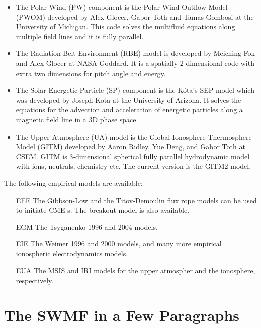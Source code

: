 \begin{itemize}
\item
The Polar Wind (PW) component is the Polar Wind Outflow Model (PWOM)
developed by Alex Glocer, Gabor Toth and Tamas Gombosi
at the University of Michigan.  This code solves the
multifluid equations along multiple field lines and it is fully parallel.

\item
The Radiation Belt Environment (RBE) model is developed by Meiching Fok
and Alex Glocer at NASA Goddard. It is a spatially 2-dimensional code with 
extra two dimensions for pitch angle and energy. 

\item
The Solar Energetic Particle (SP) component is the
K\'ota's SEP model which was developed by Joseph Kota 
at the University of Arizona.
It solves the equations for the advection and acceleration of
energetic particles along a magnetic field line in a 3D phase space.

\item
The Upper Atmosphere (UA) model is the 
Global Ionosphere-Thermosphere Model (GITM) 
developed by Aaron Ridley, Yue Deng, and Gabor Toth at CSEM.
GITM is 3-dimensional spherical
fully parallel hydrodynamic model with ions, neutrals, chemistry etc.
The current version is the GITM2 model.

\end{itemize}
The following empirical models are available:
\begin{itemize}
\item[EEE] The Gibbson-Low and the Titov-Demoulin flux rope models
          can be used to initiate CME-s. The breakout model is
          also available.
\item[EGM] The Tsyganenko 1996 and 2004 models.
\item[EIE] The Weimer 1996 and 2000 models, and many more empirical
          ionospheric electrodynamics models.
\item[EUA] The MSIS and IRI models for the upper atmospher and the 
          ionosphere, respectively.
\end{itemize}

\section{The SWMF in a Few Paragraphs}

